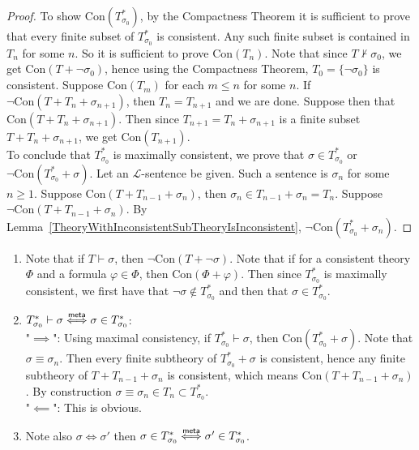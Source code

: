 \begin{proof}
    To show $\mathrm{Con}(T^\ast_{\sigma_0})$, by the Compactness Theorem it is sufficient to prove that every finite subset of $T_{\sigma_0}^\ast$ is consistent. Any such finite subset is contained in $T_n$ for some $n$. So it is sufficient to prove $\mathrm{Con}(T_n)$. Note that since $T\not\vdash \sigma_0$, we get $\mathrm{Con}(T+\neg\sigma_0)$, hence using the Compactness Theorem, $T_0=\{\neg\sigma_0\}$ is consistent. Suppose $\mathrm{Con}(T_m)$ for each $m\leq n$ for some $n$. If $\neg\mathrm{Con}(T+T_{n}+\sigma_{n+1})$, then $T_n=T_{n+1}$ and we are done. Suppose then that $\mathrm{Con}(T+T_n+\sigma_{n+1})$. Then since $T_{n+1}=T_n+\sigma_{n+1}$ is a finite subset $T+T_n+\sigma_{n+1}$, we get $\mathrm{Con}(T_{n+1})$.\\
    To conclude that $T^\ast_{\sigma_0}$ is maximally consistent, we prove that $\sigma\in T^\ast_{\sigma_0}$ or $\neg\mathrm{Con}(T^\ast_{\sigma_0}+\sigma)$. Let an $\mathcal{L}$-sentence be given. Such a sentence is $\sigma_n$ for some $n\geq 1$. Suppose $\mathrm{Con}(T+T_{n-1}+\sigma_n)$, then $\sigma_n\in T_{n-1}+\sigma_n=T_n$. Suppose $\neg\mathrm{Con}(T+T_{n-1}+\sigma_n)$. By Lemma~\ref{TheoryWithInconsistentSubTheoryIsInconsistent}, $\neg\mathrm{Con}(T^\ast_{\sigma_0}+\sigma_n)$. 
\end{proof}
\begin{remark}\label{RemarkAboutMaximallyConsistentExtensions}
    \begin{enumerate}
        \item Note that if $T \vdash \sigma$, then $\neg\mathrm{Con}(T+\neg\sigma)$. Note that if for a consistent theory $\Phi$ and a formula $\varphi\in \Phi$, then $\mathrm{Con}(\Phi+\varphi)$. Then since $T^\ast_{\sigma_0}$ is maximally consistent, we first have that $\neg \sigma\notin T^\ast_{\sigma_0}$ and then that $\sigma \in T^\ast_{\sigma_0}$.
        \item $T^\ast_{\sigma_0}\vdash \sigma \mathrel{\overset{\mathsf{meta}}{\Longleftrightarrow}} \sigma\in T^\ast_{\sigma_0}$:\\ 
        "$\implies$": Using maximal consistency, if $T^\ast_{\sigma_0}\vdash \sigma$, then $\mathrm{Con}(T^\ast_{\sigma_0}+\sigma)$. Note that $\sigma\equiv \sigma_n$. Then every finite subtheory of $T^\ast_{\sigma_0}+\sigma$ is consistent, hence any finite subtheory of $T+T_{n-1}+\sigma_n$ is consistent, which means $\mathrm{Con}(T+T_{n-1}+\sigma_n)$. By construction $\sigma\equiv \sigma_n\in T_n\subset T^\ast_{\sigma_0}$.\\
        "$\impliedby$":  This is obvious. 
        \item Note also $\sigma\iff \sigma'$ then $\sigma\in T^\ast_{\sigma_0} \mathrel{\overset{\mathsf{meta}}{\Longleftrightarrow}} \sigma'\in T^\ast_{\sigma_0}$. 
    \end{enumerate}
\end{remark}
